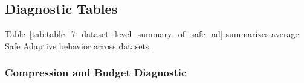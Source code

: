 \documentclass[11pt]{article}
\begin{document}
\subsection{Diagnostic Tables}
\label{app:diagnostics}

Table~\ref{tab:table_7_dataset_level_summary_of_safe_ad} summarizes average Safe Adaptive behavior across datasets.

\begin{table}[htbp]
\centering
\small
\caption{Dataset-level summary of Safe Adaptive Context. F1 retention is measured relative to Fixed Top-10 and averaged across Mistral and Llama-70B.}
\label{tab:table_7_dataset_level_summary_of_safe_ad}
\end{table}

\subsubsection{Compression and Budget Diagnostic}
\end{document}
